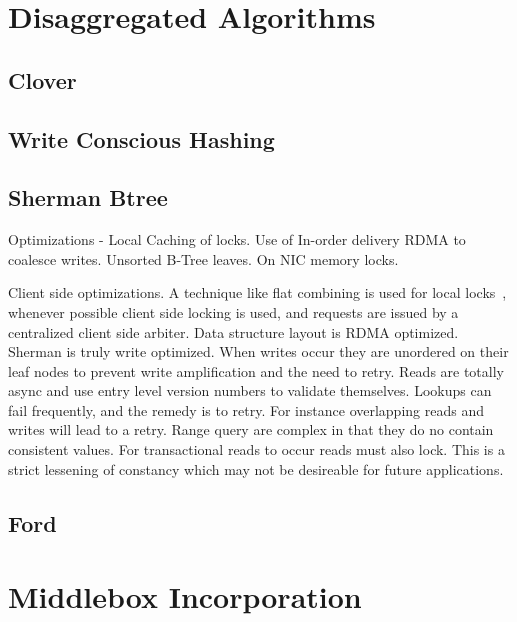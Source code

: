 \section{Disaggregated Algorithms}

\subsection{Clover}

\subsection{Write Conscious Hashing}

\subsection{Sherman Btree}

Optimizations - Local Caching of locks. Use of In-order delivery RDMA to
coalesce writes. Unsorted B-Tree leaves. On NIC memory locks.

Client side optimizations. A technique like flat combining is used for local
locks~\cite{flat-combine}, whenever possible client side locking is used, and
requests are issued by a centralized client side arbiter. Data structure layout
is RDMA optimized. Sherman is truly write optimized. When writes occur they are
unordered on their leaf nodes to prevent write amplification and the need to
retry. Reads are totally async and use entry level version numbers to validate
themselves. Lookups can fail frequently, and the remedy is to retry. For
instance overlapping reads and writes will lead to a retry. Range query are
complex in that they do no contain consistent values. For transactional reads to
occur reads must also lock. This is a strict lessening of constancy which may
not be desireable for future applications.

\subsection{Ford}

\section{Middlebox Incorporation}

